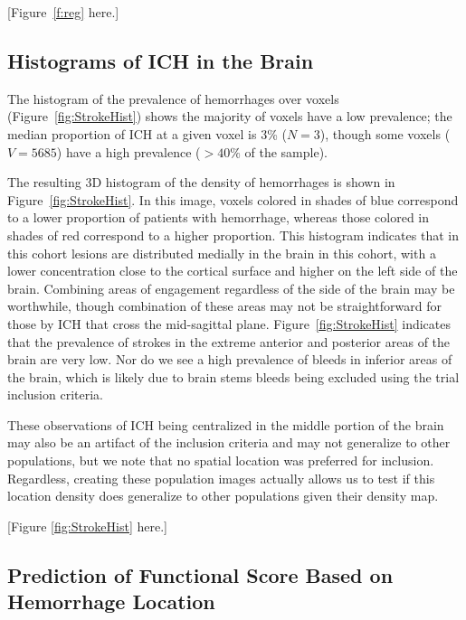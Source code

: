 \documentclass[10pt]{article}\usepackage[]{graphicx}\usepackage[]{color}
\begin{document}
[Figure~\ref{f:reg} here.]


\subsection{Histograms of ICH in the Brain}




The histogram of the prevalence of hemorrhages over voxels (Figure~\ref{fig:StrokeHist}\protect{}) shows the majority of voxels have a low prevalence; the median proportion of ICH at a given voxel is 3\% ($N = 3$), though some voxels ($V = 5685$) have a high prevalence ($> 40\%$ of the sample).  


The resulting 3D histogram of the density of hemorrhages is shown in Figure~\ref{fig:StrokeHist}\protect{}.
In this image, voxels colored in shades of blue correspond to a lower proportion of
patients with hemorrhage, whereas those colored in shades of red correspond to a higher proportion. This histogram indicates that in this cohort lesions are
distributed medially in the brain in this cohort, with a lower concentration
close to the cortical surface and higher on the left side of the brain.  Combining areas of engagement regardless of the side of the brain may be worthwhile, though combination of these areas may not be straightforward for those by ICH that cross the mid-sagittal plane.  
Figure~\ref{fig:StrokeHist}\protect{} indicates that the prevalence of strokes in the extreme anterior and posterior areas of the brain are very low.  Nor do we see a high prevalence of bleeds in inferior areas of the brain, which is likely due to brain stems bleeds being excluded using the trial inclusion criteria.  

These observations of ICH being centralized in the middle portion of the brain may also be an artifact of the inclusion criteria and may not generalize to other populations, but we note that no spatial location was preferred for inclusion.  Regardless, creating these population images actually allows us to test if this location density does generalize to other populations given their density map.


[Figure \ref{fig:StrokeHist} here.]


\subsection{Prediction of Functional Score Based on Hemorrhage Location}
\end{document}
